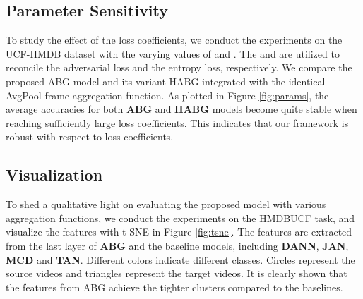 \begin{table}[t]
\caption{The ablation performance of the proposed ABG and HABG models on the full UCF-HMDB dataset.}\vspace{-0.4cm}
\label{tab:ablation}
\end{table}

\vspace{-0.3cm}
\subsection{Parameter Sensitivity}
To study the effect of the loss coefficients, we conduct the experiments on the UCF-HMDB dataset with the varying values of  and . The  and  are utilized to reconcile the adversarial loss and the entropy loss, respectively. We compare the proposed ABG model and its variant HABG integrated with the identical AvgPool frame aggregation function. As plotted in Figure \ref{fig:params}, the average accuracies for both \textbf{ABG} and \textbf{HABG} models become quite stable when reaching sufficiently large loss coefficients. This indicates that our framework is robust with respect to loss coefficients.

\vspace{-0.2cm}
\subsection{Visualization}
To shed a qualitative light on evaluating the proposed model with various aggregation functions, we conduct the experiments on the HMDBUCF task, and visualize the features with t-SNE in Figure \ref{fig:tsne}. The features are extracted from the last layer of \textbf{ABG} and the baseline models, including \textbf{DANN}, \textbf{JAN}, \textbf{MCD} and \textbf{TAN}. Different colors indicate different classes. Circles represent the source videos and triangles represent the target videos. It is clearly shown that the features from ABG achieve the tighter clusters compared to the baselines.

